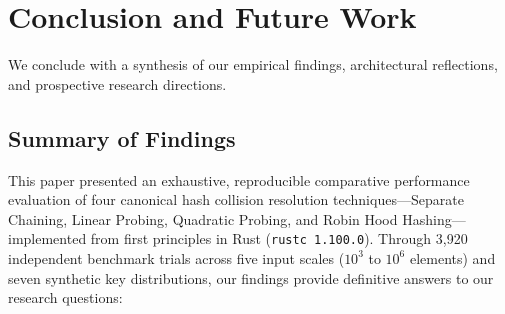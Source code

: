 \documentclass[conference]{IEEEtran}
\begin{document}
\section{Conclusion and Future Work}

We conclude with a synthesis of our empirical findings, architectural reflections, and prospective research directions.

\subsection{Summary of Findings}

This paper presented an exhaustive, reproducible comparative performance evaluation of four canonical hash collision resolution techniques---Separate Chaining, Linear Probing, Quadratic Probing, and Robin Hood Hashing---implemented from first principles in Rust (\texttt{rustc 1.100.0}). Through 3,920 independent benchmark trials across five input scales ($10^3$ to $10^6$ elements) and seven synthetic key distributions, our findings provide definitive answers to our research questions:
\end{document}
